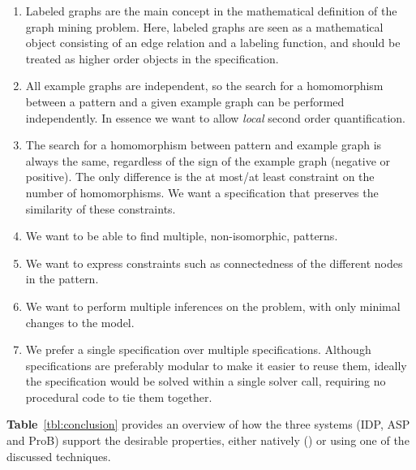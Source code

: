 \begin{enumerate}[itemsep=0mm]
\item Labeled graphs are the main concept in the mathematical definition of the graph mining problem. 
Here, labeled graphs are seen as a mathematical object consisting of an edge relation and a labeling function, and should be treated as higher order objects in the specification.
\item All example graphs are independent, so the search for a homomorphism between a pattern and a given example graph can be performed independently. 
In essence we want to allow \emph{local} second order quantification.  %
\item The search for a homomorphism between pattern and example graph is always the same, regardless of the sign of the example graph (negative or positive). The only difference is the at most/at least constraint on the number of homomorphisms.
We want a specification that preserves the similarity of these constraints.
\item We want to be able to find multiple, non-isomorphic, patterns.
\item We want to express constraints such as connectedness of the different nodes in the pattern.
\item We want to perform multiple inferences on the problem, with only minimal changes to the model.
\item We prefer a single specification over multiple specifications. 
Although specifications are preferably modular to make it easier to reuse them, ideally the specification would be solved within a single solver call, requiring no procedural code to tie them together.
\end{enumerate}
\textbf{Table}~\ref{tbl:conclusion} provides an overview of how the three systems (IDP, ASP and ProB) support the desirable properties, either natively (\checkmark) or using one of the discussed techniques.
